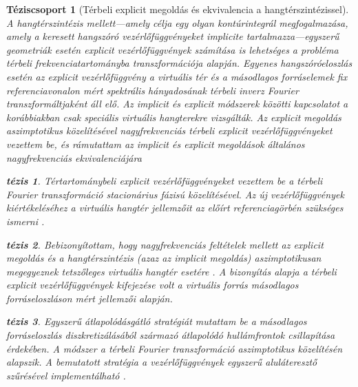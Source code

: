 \documentclass[10pt,twoside]{article}
\theoremstyle{thesisgroupstyle}
\newtheorem{thesisgroup}{Téziscsoport}
\theoremstyle{indented}
\newtheorem{thesis}{tézis}[thesisgroup]
\begin{document}
\begin{thesisgroup}[Térbeli explicit megoldás és ekvivalencia a hangtérszintézissel]
A hangtérszintézis mellett---amely célja egy olyan kontúrintegrál megfogalmazása, amely a keresett hangszóró vezérlőfüggvényeket implicite tartalmazza---egyszerű geometriák esetén explicit vezérlőfüggvények számítása is lehetséges a probléma térbeli frekvenciatartományba transzformációja alapján.
Egyenes hangszóróeloszlás esetén az explicit vezérlőfüggvény a virtuális tér és a másodlagos forráselemek fix referenciavonalon mért spektrális hányadosának térbeli inverz Fourier transzformáltjaként áll elő.
Az implicit és explicit módszerek közötti kapcsolatot a korábbiakban csak speciális virtuális hangterekre vizsgálták.
Az explicit megoldás aszimptotikus közelítésével nagyfrekvenciás térbeli explicit vezérlőfüggvényeket vezettem be, és rámutattam az implicit és explicit megoldások általános nagyfrekvenciás ekvivalenciájára \cite{Firtha2017:daga_booklet, Firtha2018:WFS_vs_SDM_booklet}
\begin{thesis}
Tértartománybeli explicit vezérlőfüggvényeket vezettem be a térbeli Fourier transzformáció stacionárius fázisú közelítésével.
Az új vezérlőfüggvények kiértékeléséhez a virtuális hangtér jellemzőit az előírt referenciagörbén szükséges ismerni \cite{Firtha2017:daga_booklet}.\end{thesis}
\begin{thesis}
Bebizonyítottam, hogy nagyfrekvenciás feltételek mellett az explicit megoldás és a hangtérszintézis (azaz az implicit megoldás) aszimptotikusan megegyeznek tetszőleges virtuális hangtér esetére \cite{Firtha2018:WFS_vs_SDM_booklet}.
A bizonyítás alapja a térbeli explicit vezérlőfüggvények kifejezése volt a virtuális forrás másodlagos forráseloszláson mért jellemzői alapján.
\end{thesis}
\begin{thesis}
Egyszerű átlapolódásgátló stratégiát mutattam be a másodlagos forráseloszlás diszkretizálásából származó átlapolódó hullámfrontok csillapítása érdekében.
A módszer a térbeli Fourier transzformáció aszimptotikus közelítésén alapszik.
A bemutatott stratégia a vezérlőfüggvények egyszerű aluláteresztő szűrésével implementálható \cite{Firtha2018_daga_a_booklet}.
\end{thesis}
\end{thesisgroup}
\end{document}
